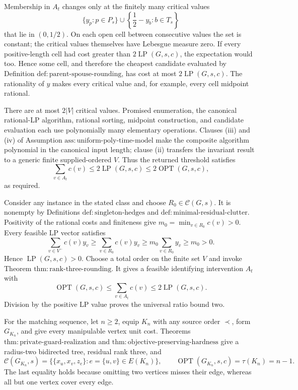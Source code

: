 Membership in \(A_t\) changes only at the finitely many critical values
\[
 \{y_p:p\in P_s\}\cup
 \left\{\frac12-y_b:b\in T_s\right\}
\]
that lie in \((0,1/2)\).  On each open cell between consecutive values the
set is constant; the critical values themselves have Lebesgue measure zero.
If every positive-length cell had cost greater than
\(2\operatorname{LP}(G,s,c)\), the expectation would too.  Hence some
cell, and therefore the cheapest candidate evaluated by Definition
\(\mathrm{def{:}parent\mbox{-}spouse\mbox{-}rounding}\), has cost at most
\(2\operatorname{LP}(G,s,c)\).  The rationality of \(y\) makes every
critical value and, for example, every cell midpoint rational.

There are at most \(2|V|\) critical values.  Promised enumeration, the
canonical rational-LP algorithm, rational sorting, midpoint construction,
and candidate evaluation each use polynomially many elementary operations.
Clauses (iii) and (iv) of Assumption
\(\mathrm{ass{:}uniform\mbox{-}poly\mbox{-}time\mbox{-}model}\) make the
composite algorithm polynomial in the canonical input length; clause (ii)
transfers the invariant result to a generic finite supplied-ordered
\(V\).  Thus the returned threshold satisfies
\[
 \sum_{v\in A_t}c(v)
 \leq2\operatorname{LP}(G,s,c)
 \leq2\operatorname{OPT}(G,s,c),
\]
as required.

Consider any instance in the stated class and choose
\(R_0\in\mathcal C(G,s)\).  It is nonempty by Definitions
\(\mathrm{def{:}singleton\mbox{-}hedges}\) and
\(\mathrm{def{:}minimal\mbox{-}residual\mbox{-}clutter}\).  Positivity of
the rational costs and finiteness give
\(m_0=\min_{v\in R_0}c(v)>0\).  Every feasible LP vector satisfies
\[
 \sum_{v\in V^{-}}c(v)y_v
 \geq\sum_{v\in R_0}c(v)y_v
 \geq m_0\sum_{v\in R_0}y_v
 \geq m_0>0.
\]
Hence \(\operatorname{LP}(G,s,c)>0\).  Choose a total order on the finite
set \(V\) and invoke Theorem
\(\mathrm{thm{:}rank\mbox{-}three\mbox{-}rounding}\).  It gives a feasible
identifying intervention \(A_t\) with
\[
 \operatorname{OPT}(G,s,c)
 \leq\sum_{v\in A_t}c(v)
 \leq2\operatorname{LP}(G,s,c).
\]
Division by the positive LP value proves the universal ratio bound two.

For the matching sequence, let \(n\geq2\), equip \(K_n\) with any source
order \(\prec\), form \(G_{K_n}\), and give every manipulable vertex unit
cost.  Theorems
\(\mathrm{thm{:}private\mbox{-}guard\mbox{-}realization}\) and
\(\mathrm{thm{:}objective\mbox{-}preserving\mbox{-}hardness}\) give a
radius-two bidirected tree, residual rank three, and
\[
 \mathcal C(G_{K_n},s)
 =\bigl\{\{x_u,x_v,z_e\}:e=\{u,v\}\in E(K_n)\bigr\},
 \qquad
 \operatorname{OPT}(G_{K_n},s,c)=\tau(K_n)=n-1.
\]
The last equality holds because omitting two vertices misses their edge,
whereas all but one vertex cover every edge.

